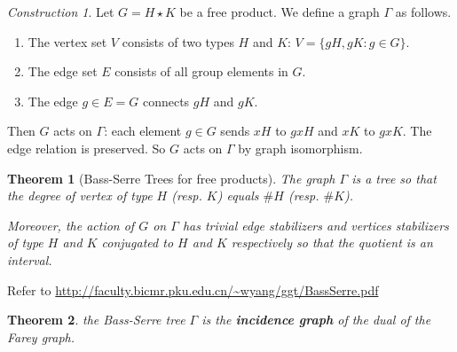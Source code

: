 \documentclass[11pt, a4paper]{article}
\theoremstyle{plain}
\newtheorem{theorem}{Theorem}[section]
\theoremstyle{definition}
\theoremstyle{remark}
\newtheorem{construction}{Construction}[section]
\begin{document}
\begin{construction}
    Let $G = H \star K$ be a free product. We define a graph $\Gamma$ as follows.
    \begin{enumerate}
        \item The vertex set $V$ consists of two types $H$ and $K$: $V = \{gH, gK : g \in G\}$.
        \item The edge set $E$ consists of all group elements in $G$.
        \item The edge $g \in E = G$ connects $gH$ and $gK$.
    \end{enumerate}

    Then $G$ acts on $\Gamma$: each element $g \in G$ sends $xH$ to $gxH$ and $xK$ to $gxK$. The edge relation is preserved. So $G$ acts on $\Gamma$ by graph isomorphism.
\end{construction}

\begin{theorem}[Bass-Serre Trees for free products]
    The graph $\Gamma$ is a tree so that the degree of vertex of type $H$ (resp. $K$) equals $\#H$ (resp. $\#K$).

Moreover, the action of $G$ on $\Gamma$ has trivial edge stabilizers and vertices stabilizers of type $H$ and $K$ conjugated to $H$ and $K$ respectively so that the quotient is an interval.
\end{theorem}


Refer to \url{http://faculty.bicmr.pku.edu.cn/~wyang/ggt/BassSerre.pdf}


\begin{theorem}
    the Bass-Serre tree $\Gamma$ is the \textbf{incidence graph} of the dual of the Farey graph.
\end{theorem}
\end{document}
